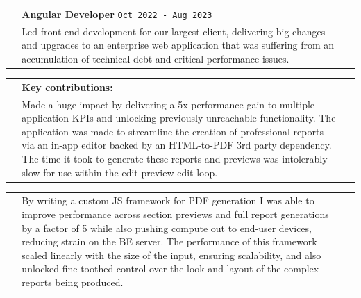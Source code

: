 \documentclass[letterpaper,11pt]{article}
\begin{document}
\begin{tabular*}{6.6in}{p{0.2in}p{6.3in}p{0in}}

  \, &
  { \textbf{\small Angular Developer}\cftdotfill{\cftdotsep} \texttt{\small Oct 2022 - Aug 2023}} &
   \, \\


  \, &
       {\small

       Led front-end development for our largest client, delivering big changes and upgrades to an enterprise web application that was suffering from an accumulation of technical debt and critical performance issues.
       
       } &
   \, \\
  

\end{tabular*}


\vspace{-8pt}

\begin{tabular*}{6.6in}{p{0.2in}p{6.3in}p{0in}}
  
  \, &  
     { \textbf{\footnotesize Key contributions:}
     } &
   \, \\
  
  \, &
       
  {\small
       
       Made a huge impact by delivering a 5x performance gain to multiple application KPIs and unlocking previously unreachable functionality. The application was made to streamline the creation of professional reports via an in-app editor backed by an HTML-to-PDF 3rd party dependency. The time it took to generate these reports and previews was intolerably slow for use within the edit-preview-edit loop.
 
       } &
           
    \, \\  

\end{tabular*}

\vspace{-12pt}

\begin{tabular*}{6.6in}{p{0.2in}p{6.3in}p{0in}}


\, &
  
{\small
     
       \qquad By writing a custom JS framework for PDF generation I was able to improve performance across section previews and full report generations by a factor of 5 while also pushing compute out to end-user devices, reducing strain on the BE server. The performance of this framework scaled linearly with the size of the input, ensuring scalability, and also unlocked fine-toothed control over the look and layout of the complex reports being produced.

     } &
         \, \\

\end{tabular*}
\end{document}
